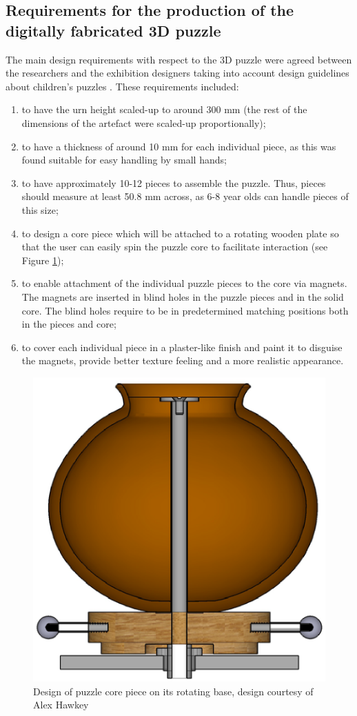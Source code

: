 \documentclass[acmlarge,screen]{acmart}
\begin{document}
\subsection{Requirements for the production of the digitally fabricated 3D puzzle}
The main design requirements with respect to the 3D puzzle were agreed between the researchers and the exhibition designers taking into account design guidelines about children's puzzles \cite{Smith2002}. These requirements included:
\begin{enumerate}
\item to have the urn height scaled-up to around 300 mm (the rest of the dimensions of the artefact were scaled-up proportionally);
\item to have a thickness of around 10 mm for each individual piece, as this was found suitable for easy handling by small hands;
\item to have approximately 10-12 pieces to assemble the puzzle. Thus, pieces should measure at least 50.8 mm across, as 6-8 year olds can handle pieces of this size;
\item to design a core piece which will be attached to a rotating wooden plate so that the user can easily spin the puzzle core to facilitate interaction (see Figure \ref{fig:alexdesign});
\item to enable attachment of the individual puzzle pieces to the core via magnets. The magnets are inserted in blind holes in the puzzle pieces and in the solid core. The blind holes require to be in predetermined matching positions both in the pieces and core;
\item  to cover each individual piece in a plaster-like finish and paint it to disguise the magnets, provide better texture feeling and a more realistic appearance.
\end{enumerate} 

\begin{figure}[h]
  \centering
  \includegraphics[width=0.6\linewidth]{images/alexdesign}
  \caption{\label{fig:alexdesign}
    Design of puzzle core piece on its rotating base, design courtesy of Alex Hawkey}
\end{figure}
\end{document}
